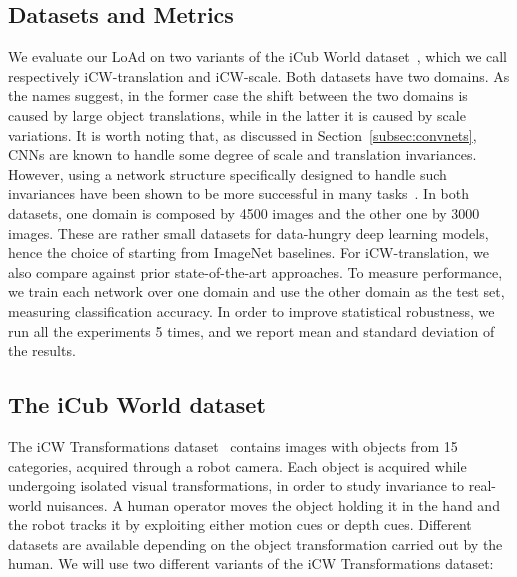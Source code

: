 \documentclass[../main.tex]{subfiles}
\begin{document}
    \subsection{Datasets and Metrics}
    We evaluate our LoAd on two variants of the iCub World dataset~\cite{icw}, which we call respectively iCW-translation and iCW-scale.
    Both datasets have two domains. As the names suggest, in the former case the shift between the two domains is caused by large
    object translations, while in the latter it is caused by scale variations. It is worth noting that, as discussed in Section~\ref{subsec:convnets},
    CNNs are known to handle some degree of scale and translation invariances. However, using a network structure specifically designed
    to handle such invariances have been shown to be more successful in many tasks~\cite{sppooling}. 
    In both datasets, one domain is composed by 4500 images and the other one by 3000 images. These are rather small
    datasets for data-hungry deep learning models, hence the choice of starting from ImageNet baselines.
    For iCW-translation, we also compare against prior state-of-the-art approaches.
    \newline\newline
    To measure performance, we train each network over one domain and use the other domain as the test set, measuring
    classification accuracy. In order to improve statistical robustness, we run all the
    experiments 5 times, and we report mean and standard deviation of the results.

    \subsection{The iCub World dataset}
    The iCW Transformations dataset~\cite{icw} contains images with objects from 15 categories, acquired through a robot camera.
    Each object is acquired while undergoing isolated visual transformations, in order to study invariance to real-world nuisances.
    A human operator moves the object holding it in the hand and the robot tracks it by exploiting either motion cues or depth cues.
    Different datasets are available depending on the object transformation carried out by the human.
    We will use two different variants of the iCW Transformations dataset:
\end{document}
